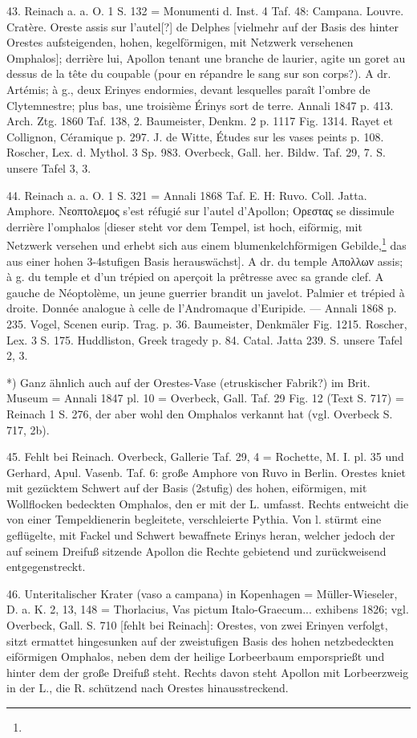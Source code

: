 \documentclass[a4paper, 11pt, oneside]{article}
\begin{document}
43. Reinach a. a. O. 1 S. 132 = Monumenti d. Inst. 4 Taf. 48: Campana. Louvre. Cratère. Oreste assis sur l'autel[?] de Delphes [vielmehr auf der Basis des hinter Orestes aufsteigenden, hohen, kegelförmigen, mit Netzwerk versehenen Omphalos]; derrière lui, Apollon tenant une branche de laurier, agite un goret au dessus de la tête du coupable (pour en répandre le sang sur son corps?). A dr. Artémis; à g., deux Erinyes endormies, devant lesquelles paraît l'ombre de Clytemnestre; plus bas, une troisième Érinys sort de terre. Annali 1847 p. 413. Arch. Ztg. 1860 Taf. 138, 2. Baumeister, Denkm. 2 p. 1117 Fig. 1314. Rayet et Collignon, Céramique p. 297. J. de Witte, Études sur les vases peints p. 108. Roscher, Lex. d. Mythol. 3 Sp. 983. Overbeck, Gall. her. Bildw. Taf. 29, 7. S. unsere Tafel 3, 3.

44. Reinach a. a. O. 1 S. 321 = Annali 1868 Taf. E. H: Ruvo. Coll. Jatta. Amphore. Νεοπτολεμος s'est réfugié sur l'autel d'Apollon; Ορεστας se dissimule derrière l'omphalos [dieser steht vor dem Tempel, ist hoch, eiförmig, mit Netzwerk versehen und erhebt sich aus einem blumenkelchförmigen Gebilde,\footnote{} das aus einer hohen 3-4stufigen Basis herauswächst]. A dr. du temple Απολλων assis; à g. du temple et d'un trépied on aperçoit la prêtresse avec sa grande clef. A gauche de Néoptolème, un jeune guerrier brandit un javelot. Palmier et trépied à droite. Donnée analogue à celle de l'Andromaque d'Euripide. --- Annali 1868 p. 235. Vogel, Scenen eurip. Trag. p. 36. Baumeister, Denkmäler Fig. 1215. Roscher, Lex. 3 S. 175. Huddliston, Greek tragedy p. 84. Catal. Jatta 239. S. unsere Tafel 2, 3.

*) Ganz ähnlich auch auf der Orestes-Vase (etruskischer Fabrik?) im Brit. Museum = Annali 1847 pl. 10 = Overbeck, Gall. Taf. 29 Fig. 12 (Text S. 717) = Reinach 1 S. 276, der aber wohl den Omphalos verkannt hat (vgl. Overbeck S. 717, 2b).

45. Fehlt bei Reinach. Overbeck, Gallerie Taf. 29, 4 = Rochette, M. I. pl. 35 und Gerhard, Apul. Vasenb. Taf. 6: große Amphore von Ruvo in Berlin. Orestes kniet mit gezücktem Schwert auf der Basis (2stufig) des hohen, eiförmigen, mit Wollflocken bedeckten Omphalos, den er mit der L. umfasst. Rechts entweicht die von einer Tempeldienerin begleitete, verschleierte Pythia. Von l. stürmt eine geflügelte, mit Fackel und Schwert bewaffnete Erinys heran, welcher jedoch der auf seinem Dreifuß sitzende Apollon die Rechte gebietend und zurückweisend entgegenstreckt.

46. Unteritalischer Krater (vaso a campana) in Kopenhagen = Müller-Wieseler, D. a. K. 2, 13, 148 = Thorlacius, Vas pictum Italo-Graecum... exhibens 1826; vgl. Overbeck, Gall. S. 710 [fehlt bei Reinach]: Orestes, von zwei Erinyen verfolgt, sitzt ermattet hingesunken auf der zweistufigen Basis des hohen netzbedeckten eiförmigen Omphalos, neben dem der heilige Lorbeerbaum emporsprießt und hinter dem der große Dreifuß steht. Rechts davon steht Apollon mit Lorbeerzweig in der L., die R. schützend nach Orestes hinausstreckend.
\end{document}
